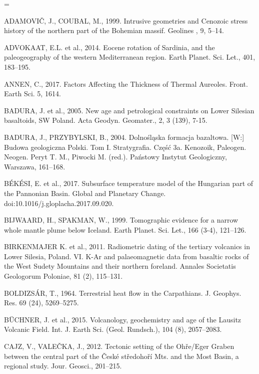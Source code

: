 \documentclass[11.5pt,twoside]{report}
\begin{document}

\begin{multicols}{3} %
	
\parskip=\smallskipamount
\setlength\parindent{0pt}

\begingroup
\footnotesize

\uppercase{AdamoviČ, J., Coubal, M., 1999.} Intrusive geometries and Cenozoic stress history of the northern part of the Bohemian massif. Geolines , 9, 5–14.

\uppercase{Advokaat, E.L.} et al., 2014. Eocene rotation of Sardinia, and the paleogeography of the western Mediterranean region. Earth Planet. Sci. Let., 401, 183–195.

\uppercase{Annen, C., 2017.} Factors Affecting the Thickness of Thermal Aureoles. Front. Earth Sci. 5, 1614. 

\uppercase{Badura, J.} et al., 2005. New age and petrological constraints on Lower Silesian basaltoids, SW Poland. Acta Geodyn. Geomater., 2, 3 (139), 7-15.

\uppercase{Badura, J., Przybylski, B., 2004.} Dolnośląska formacja bazaltowa. [W:] Budowa geologiczna Polski. Tom I. Stratygrafia. Część 3a. Kenozoik, Paleogen. Neogen. Peryt T. M., Piwocki M. (red.). Państowy Instytut Geologiczny, Warszawa, 161–168.

\uppercase{B\'{E}k\'{E}si, E.} et al., 2017. Subsurface temperature model of the Hungarian part of the Pannonian Basin. Global and Planetary Change. doi:10.1016/j.gloplacha.2017.09.020.

\uppercase{Bijwaard, H., Spakman, W.}, 1999. Tomographic evidence for a narrow whole mantle plume below Iceland. Earth Planet. Sci. Let., 166 (3-4), 121–126.

\uppercase{Birkenmajer K.} et al., 2011. Radiometric dating of the tertiary volcanics in Lower Silesia, Poland. VI. K-Ar and palaeomagnetic data from basaltic rocks of the West Sudety Mountains and their northern foreland. Annales Societatis Geologorum Poloniae, 81 (2), 115–131.

\uppercase{Boldizs\'{A}r, T., 1964.} Terrestrial heat flow in the Carpathians. J. Geophys. Res. 69 (24), 5269–5275. 

\uppercase{B\"{U}chner, J.} et al., 2015. Volcanology, geochemistry and age of the Lausitz Volcanic Field. Int. J. Earth Sci. (Geol. Rundsch.), 104 (8), 2057–2083. 

\uppercase{Cajz, V., ValeČka, J., 2012.} Tectonic setting of the Ohře/Eger Graben between the central part of the České středohoří Mts. and the Most Basin, a regional study. Jour. Geosci., 201–215. 


\end{multicols}
\end{document}
